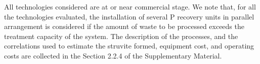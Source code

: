 \documentclass[authoryear]{elsarticle}
\begin{document}
All technologies considered are at or near commercial stage. We note that, for all the technologies evaluated, the installation of several P recovery units in parallel arrangement is considered if the amount of waste to be processed exceeds the treatment capacity of the system. The description of the processes, and the correlations used to estimate the struvite formed, equipment cost, and operating costs are collected in the Section 2.2.4 of the Supplementary Material.
%
\end{document}
